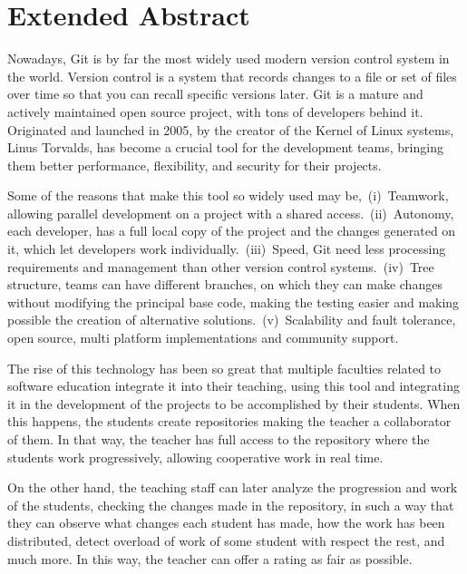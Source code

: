 \chapter*{Extended Abstract\label{00Abstractsummary}}


Nowadays, Git\cite{git} is by far the most widely used modern version control system
in the world. Version control is a system that records changes to a
file or set of files over time so that you can recall specific versions
later. Git is a mature and actively maintained open source project, with
tons of developers behind it. Originated and launched in 2005, by the
creator of the Kernel of Linux systems, Linus Torvalds, has become a
crucial tool for the development teams, bringing them better performance,
flexibility, and security for their projects.

Some of the reasons that make this tool so widely used may
be,~(i)~Teamwork, allowing parallel development on a project with a shared
access.~(ii)~Autonomy, each developer, has a full local copy of the project
and the changes generated on it, which let developers work
individually.~(iii)~Speed, Git need less processing requirements and
management than other version control systems.~(iv)~Tree structure, teams
can have different branches, on which they can make changes without
modifying the principal base code, making the testing easier and making
possible the creation of alternative solutions.~(v)~Scalability and fault
tolerance, open source, multi platform implementations and community
support.

The rise of this technology has been so great that multiple faculties
related to software education integrate it into their teaching, using this
tool and integrating it in the development of the projects to be
accomplished by their students. When this happens, the students create
repositories making the teacher a collaborator of them. In that way, the
teacher has full access to the repository where the students work
progressively, allowing cooperative work in real time.

On the other hand, the teaching staff can later analyze the progression and
work of the students, checking the changes made in the repository, in such
a way that they can observe what changes each student has made, how the
work has been distributed, detect overload of work of some student with
respect the rest, and much more. In this way, the teacher can offer a rating
as fair as possible.

